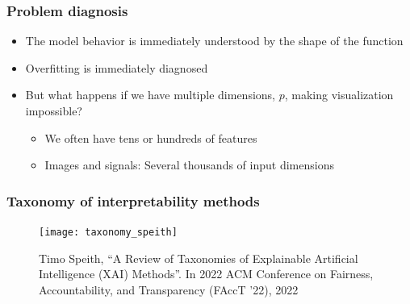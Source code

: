 \begin{frame}
  \frametitle{Problem diagnosis}

  \begin{itemize}
  \item The model behavior is immediately understood by the shape of the function
  \item Overfitting is immediately diagnosed
  \item But what happens if we have multiple dimensions, $p$, making
    visualization impossible?
    \begin{itemize}
    \item We often have tens or hundreds of features
    \item Images and signals: Several thousands of input dimensions
    \end{itemize}
  \end{itemize}
\end{frame}

\begin{frame}
  \frametitle{Taxonomy of interpretability methods}
  \begin{figure}
    \texttt{[image: taxonomy\_speith]}
    \caption{\footnotesize Timo Speith, ``A Review of Taxonomies of Explainable
      Artificial Intelligence (XAI) Methods''. In 2022 ACM Conference on
      Fairness, Accountability, and Transparency (FAccT '22), 2022}
  \end{figure}
\end{frame}

